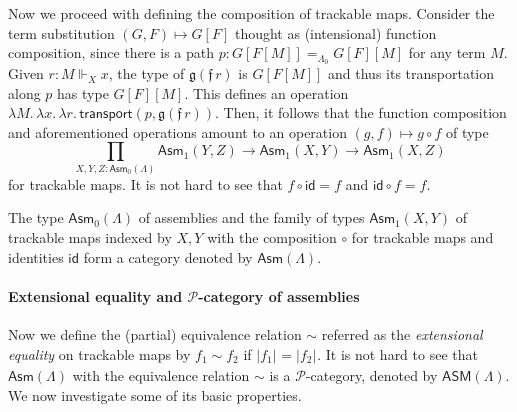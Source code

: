 \documentclass[a4paper,UKenglish,numberwithinsect,cleveref,thm-restate]{lipics-v2021}
\newcommand{\tproj}[3][]{\mathopen{}\left|#3\right|_{#2}^{#1}\mathclose{}}
\newcommand{\bproj}[1]{\tproj{}{#1}}
\newcommand{\PP}{\mathscr{P}}
\newcommand{\Asm}{\mathsf{Asm}}
\newcommand{\ASM}{\mathsf{ASM}}
\newcommand{\id}{\mathsf{id}}
\DeclareRobustCommand\longtwoheadrightarrow{\relbar\joinrel\twoheadrightarrow}
\newcommand{\reduce}{\longtwoheadrightarrow_{\beta}}
\theoremstyle{plain}
\begin{document}
Now we proceed with defining the composition of trackable maps. Consider the term substitution $(G, F)
\mapsto G [ F ]$ thought as (intensional) function composition, since there is a path $p : G[F[M]] =_{\Lambda_0} G[F] [M]$ for any term $M$.
Given $r : M \Vdash_X x$, the type of $\mathfrak{g}(\mathfrak{f}\,r)$ is $G[F[M]]$ and thus its transportation along $p$ has type $G[F][M]$.
This defines an operation $\lambda M.\,\lambda x.\,\lambda r.\, \mathsf{transport}(p, \mathfrak{g}(\mathfrak{f}\,r))$.
Then, it follows that the function composition and aforementioned operations amount to an operation $(g, f) \mapsto g \circ f$ of type
\[
  \prod_{X, Y, Z : \Asm_0(\Lambda)} \Asm_1(Y, Z) \to \Asm_1(X, Y) \to \Asm_1(X, Z)
\]
for trackable maps. It is not hard to see that $f \circ \id = f$ and $\id \circ f = f$.

\begin{proposition}\label{prop:category-of-assemblies}
  The type $\Asm_0(\Lambda)$ of assemblies and the family of types $\Asm_1(X, Y)$ of trackable maps indexed by $X, Y$ with the composition $\circ$ for trackable maps and identities $\id$ form a category denoted by $\Asm(\Lambda)$.
\end{proposition}



\paragraph*{Extensional equality and \texorpdfstring{$\PP$}{P}-category of assemblies}

Now we define the (partial) equivalence relation $\sim$ referred as the \emph{extensional equality} on trackable maps by $f_1 \sim f_2$ if $\bproj{f_1} = \bproj{f_2}$.
It is not hard to see that $\Asm(\Lambda)$ with the equivalence relation $\sim$ is a $\PP$-category, denoted by $\ASM(\Lambda)$. 
We now investigate some of its basic properties.
\end{document}
